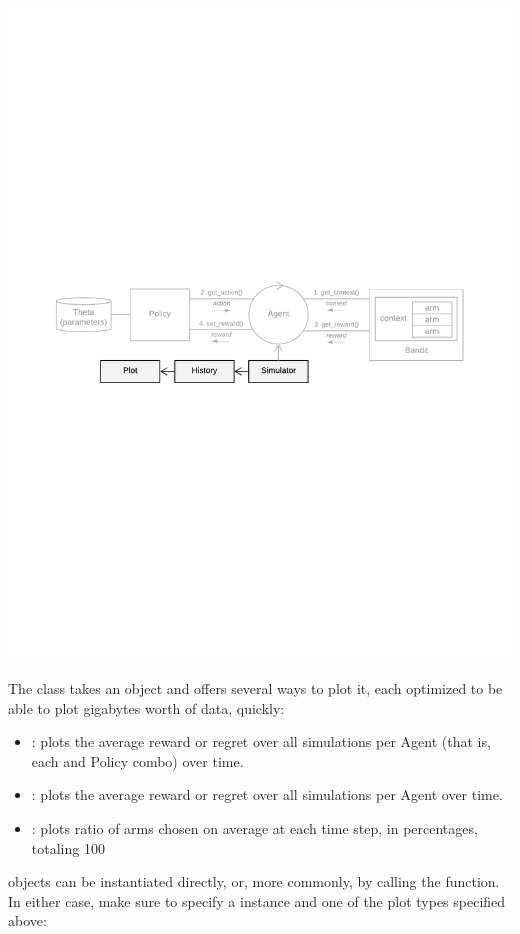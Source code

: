 \documentclass{jss}
\begin{document}
\includegraphics[width=\textwidth]{fig/all_cmab_phases_Part8}

The  class takes an  object and offers several ways to plot it, each optimized to be able to plot gigabytes worth of data, quickly:

\begin{itemize}
         \item {}: plots the average reward or regret over all simulations per Agent (that is, each  and Policy combo) over time.
         \item {}: plots the average reward or regret over all simulations per Agent over time.
         \item {}: plots ratio of arms chosen on average at each time step, in percentages, totaling 100%

\end{itemize}

 objects can be instantiated directly, or, more commonly, by calling the  function. In either case, make sure to specify a  instance and one of the plot types specified above:
\end{document}
